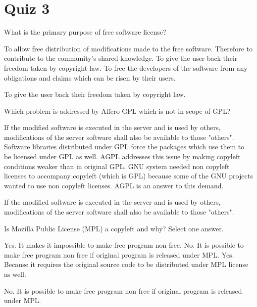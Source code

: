\section{Quiz 3}
\begin{question}[type=exam]
What is the primary purpose of free software license?
\begin{itemize}
\chk To allow free distribution of modifications made to the free software. Therefore to contribute to the community's shared knowledge.
\chk To give the user back their freedom taken by copyright law.
\chk To free the developers of the software from any obligations and claims which can be risen by their users.
\end{itemize}
\end{question}
\begin{solution}
To give the user back their freedom taken by copyright law.
\end{solution}


\begin{question}[type=exam]
Which problem is addressed by Affero GPL which is not in scope of GPL?
\begin{itemize}
\chk If the modified software is executed in the server and is used by others, modifications of the server software shall also be available to those "others".
\chk Software libraries distributed under GPL force the packages which use them to be licensed under GPL as well. AGPL addresses this issue by making copyleft conditions weaker than in original GPL.
\chk GNU system needed non copyleft licenses to accompany copyleft (which is GPL) because some of the GNU projects wanted to use non copyleft licenses. AGPL is an answer to this demand.
\end{itemize}
\end{question}
\begin{solution}
If the modified software is executed in the server and is used by others, modifications of the server software shall also be available to those "others".
\end{solution}


\begin{question}[type=exam]
Is Mozilla Public License (MPL) a copyleft and why? Select one answer.
\begin{itemize}
\chk Yes. It makes it impossible to make free program non free.
\chk No. It is possible to make free program non free if original program is released under MPL.
\chk Yes. Because it requires the original source code to be distributed under MPL license as well.
\end{itemize}
\end{question}
\begin{solution}
No. It is possible to make free program non free if original program is released under MPL.
\end{solution}


